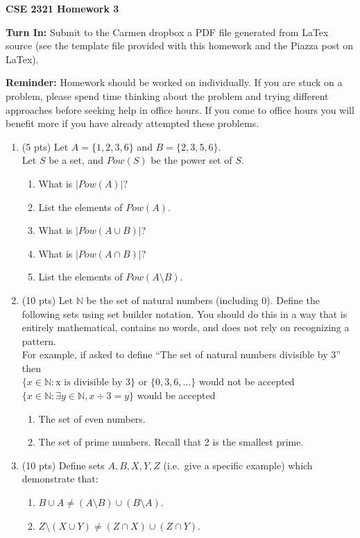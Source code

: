 \documentclass[14pt]{extarticle}
\begin{document}
\textbf{CSE 2321 Homework 3}

\textbf{Turn In:} Submit to the Carmen dropbox a PDF file generated from LaTex source (see the template file provided with this homework and the Piazza post on LaTex).

\textbf{Reminder:} Homework should be worked on individually. If you are stuck on a problem, please spend time thinking about the problem and trying different approaches before seeking help in office hours. If you come to office hours you will benefit more if you have already attempted these problems. 

\begin{enumerate}

\item (5 pts) Let $A = \{1, 2, 3, 6\}$ and $B = \{2, 3, 5, 6\}$.\\Let $S$ be a set, and $Pow(S)$ be the power set of $S$.
\begin{enumerate}
\item What is $|Pow(A)|$?
\item List the elements of $Pow(A)$.
\item What is $|Pow(A \cup B)|$?
\item What is $|Pow(A \cap B)|$?
\item List the elements of $Pow(A \setminus B)$.
\end{enumerate}

\item (10 pts) Let $\mathbb{N}$ be the set of natural numbers (including 0). Define the following sets using set builder notation. You should do this in a way that is entirely mathematical, contains no words, and does not rely on recognizing a pattern. \\For example, if asked to define ``The set of natural numbers divisible by 3'' then 
\\$\{x \in \mathbb{N} : \mbox{x is divisible by 3}\}$ or $\{0, 3, 6, \ldots\}$ would not be accepted\\
$\{x \in \mathbb{N} : \exists y \in \mathbb{N}, x \div 3 = y \}$ would be accepted
\begin{enumerate}
\item The set of even numbers.
\item The set of prime numbers. Recall that 2 is the smallest prime.
\end{enumerate}

\item (10 pts) Define sets $A, B, X, Y, Z$ (i.e.~give a specific example) which demonstrate that:
\begin{enumerate}
\item $B \cup A \neq (A \setminus B) \cup (B \setminus A)$.
\item $Z \setminus (X \cup Y) \neq (Z \cap X) \cup (Z \cap Y)$.
\end{enumerate}


\end{enumerate}
\end{document}
